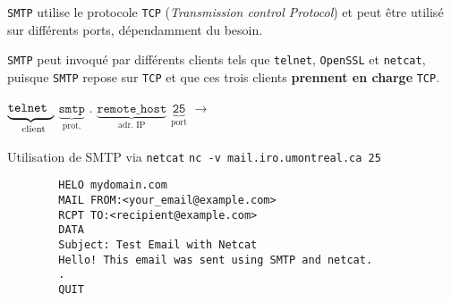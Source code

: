 \documentclass[a4paper]{report}
\begin{document}
    \texttt{SMTP}   utilise le protocole \texttt{TCP} (\textit{Transmission control Protocol}) 
    et peut être utilisé sur différents ports, dépendamment du besoin.

    \begin{center}
    \end{center}

    \texttt{SMTP} peut invoqué par différents clients tels que  
    \texttt{telnet}, \texttt{OpenSSL}  et \texttt{netcat}, puisque \texttt{SMTP} repose 
    sur \texttt{TCP} et que ces trois clients \textbf{prennent en charge} \texttt{TCP}.      

    \begin{center}
        \( \underbrace{\texttt{telnet\phantom{p}}}_{\text{\phantom{p}client}}  \)
        \( \underbrace{\texttt{smtp}}_{\text{prot.}}  \)
        .
        \( \underbrace{\texttt{remote\_host}}_{\text{adr. IP}}  \)
        \( \underbrace{\texttt{25}}_{\text{port}}  \)
        $\longrightarrow$
    \end{center}


    \begin{EExample}{Utilisation de SMTP via \texttt{netcat}}{}
        \texttt{nc -v mail.iro.umontreal.ca 25}  
        \begin{lstlisting}
        HELO mydomain.com
        MAIL FROM:<your_email@example.com>
        RCPT TO:<recipient@example.com>
        DATA
        Subject: Test Email with Netcat
        Hello! This email was sent using SMTP and netcat.
        .
        QUIT
        \end{lstlisting} 
        \begin{center}
            \hyperlink{Utilisation de SMTP via netcat}{
                }
        \end{center}
    \end{EExample}
\end{document}
